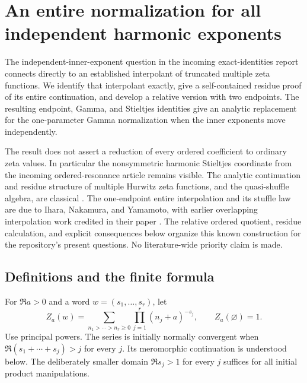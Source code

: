\section{An entire normalization for all independent harmonic exponents}
\label{eht:sec}

The independent-inner-exponent question in the incoming exact-identities
report connects directly to an established interpolant of truncated
multiple zeta functions.  We identify that interpolant exactly, give a
self-contained residue proof of its entire continuation, and develop a
relative version with two endpoints.  The resulting endpoint, Gamma, and
Stieltjes identities give an analytic replacement for the one-parameter
Gamma normalization when the inner exponents move independently.

The result does not assert a reduction of every ordered coefficient to
ordinary zeta values.  In particular the nonsymmetric harmonic Stieltjes
coordinate from the incoming ordered-resonance article remains visible.
The analytic continuation and residue structure of multiple Hurwitz zeta
functions, and the quasi-shuffle algebra, are classical
\cite{eht:MehtaViswanadham,eht:Hoffman}.  The one-endpoint entire
interpolation and its stuffle law are due to Ihara, Nakamura, and Yamamoto,
with earlier overlapping interpolation work credited in their paper
\cite{eht:INY}.  The relative ordered quotient, residue calculation, and
explicit consequences below organize this known construction for the
repository's present questions.  No literature-wide priority claim is made.

\subsection{Definitions and the finite formula}

For $\Re a>0$ and a word $w=(s_1,\ldots,s_r)$, let
\begin{equation}\label{eht:Z}
 Z_a(w)=\sum_{n_1>\cdots>n_r\ge0}
              \prod_{j=1}^r(n_j+a)^{-s_j},\qquad Z_a(\varnothing)=1.
\end{equation}
Use principal powers.  The series is initially normally convergent when
$\Re(s_1+\cdots+s_j)>j$ for every $j$.  Its meromorphic continuation is
understood below.  The deliberately smaller domain $\Re s_j>1$ for every
$j$ suffices for all initial product manipulations.

